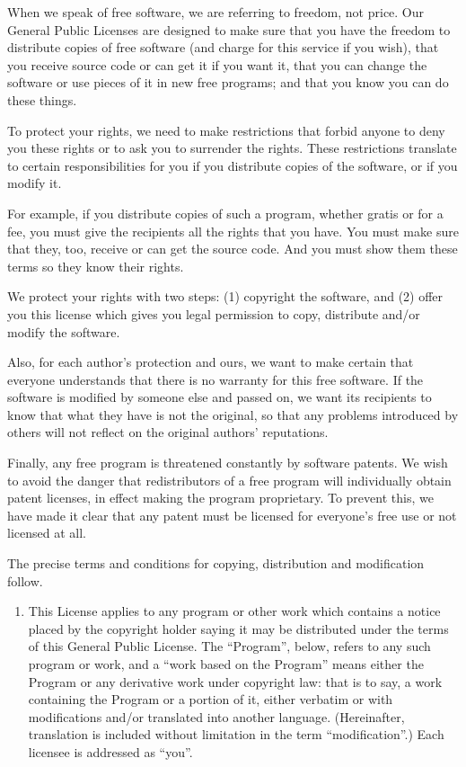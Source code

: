 \documentclass[letterpaper,10pt,english]{sphinxmanual}
\begin{document}
\sphinxAtStartPar
When we speak of free software, we are referring to freedom, not price. Our General Public Licenses are designed to make sure that you have the freedom to distribute copies of free software (and charge for this service if you wish), that you receive source code or can get it if you want it, that you can change the software or use pieces of it in new free programs; and that you know you can do these things.

\sphinxAtStartPar
To protect your rights, we need to make restrictions that forbid anyone to deny you these rights or to ask you to surrender the rights. These restrictions translate to certain responsibilities for you if you distribute copies of the software, or if you modify it.

\sphinxAtStartPar
For example, if you distribute copies of such a program, whether gratis or for a fee, you must give the recipients all the rights that you have. You must make sure that they, too, receive or can get the source code. And you must show them these terms so they know their rights.

\sphinxAtStartPar
We protect your rights with two steps: (1) copyright the software, and (2) offer you this license which gives you legal permission to copy, distribute and/or modify the software.

\sphinxAtStartPar
Also, for each author’s protection and ours, we want to make certain that everyone understands that there is no warranty for this free software. If the software is modified by someone else and passed on, we want its recipients to know that what they have is not the original, so that any problems introduced by others will not reflect on the original authors’ reputations.

\sphinxAtStartPar
Finally, any free program is threatened constantly by software patents. We wish to avoid the danger that redistributors of a free program will individually obtain patent licenses, in effect making the program proprietary. To prevent this, we have made it clear that any patent must be licensed for everyone’s free use or not licensed at all.

\sphinxAtStartPar
The precise terms and conditions for copying, distribution and modification follow.

\sphinxAtStartPar
{}
\begin{enumerate}
%
\setcounter{enumi}{-1}
\item {} 
\sphinxAtStartPar
This License applies to any program or other work which contains a notice placed by the copyright holder saying it may be distributed under the terms of this General Public License. The “Program”, below, refers to any such program or work, and a “work based on the Program” means either the Program or any derivative work under copyright law: that is to say, a work containing the Program or a portion of it, either verbatim or with modifications and/or translated into another language. (Hereinafter, translation is included without limitation in the term “modification”.) Each licensee is addressed as “you”.

\end{enumerate}
\end{document}
